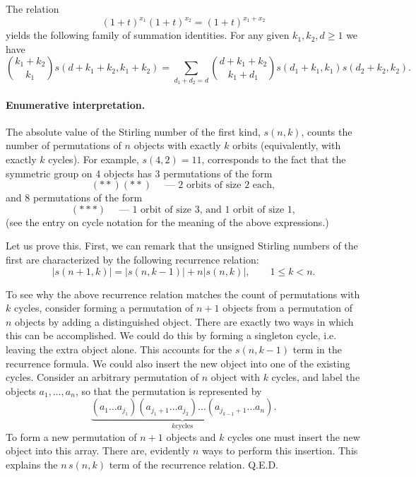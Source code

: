 \documentclass[12pt]{article}
\begin{document}
The relation
$$(1+t)^{x_1} (1+t)^{x_2} = (1+t)^{x_1+x_2}$$
yields the following family of summation identities. For any given
$k_1,k_2,d\geq 1$ we have 
$$
\binom{k_1+k_2}{k_1} s(d+k_1+k_2,k_1+k_2) =
\sum_{d_1+d_2=d} \binom{d+k_1+k_2}{k_1+d_1} s(d_1+k_1,k_1)
s(d_2+k_2,k_2).$$

\paragraph{Enumerative interpretation.}
The absolute value of the Stirling number of the first kind, $s(n,k)$,
counts the number of permutations of $n$ objects with exactly $k$
orbits (equivalently, with exactly $k$ cycles).  For example, $s(4,2)=11$, corresponds to the fact that
the symmetric group on 4 objects has $3$ permutations of the form
$$(* *)(* *)\quad \mbox{ --- 2 orbits of size 2 each},$$
and $8$ permutations
of the form 
$$(* * *)\quad \mbox{ --- 1 orbit of size 3, and 1 orbit of size
  1},$$
(see the entry on cycle notation for the meaning of the above
expressions.)

Let us prove this.  First, we can remark that the unsigned Stirling
numbers of the first are characterized by the following recurrence
relation:
$$|s(n+1,k)| = |s(n,k-1)| + n|s(n,k)|,\qquad 1\leq k < n.$$ 

To see why the above recurrence relation matches the count of
permutations with $k$ cycles, consider forming a permutation of $n+1$
objects from a permutation of $n$ objects by adding a distinguished
object.  There are exactly two ways in which this can be accomplished.
We could do this by forming a singleton cycle, i.e. leaving the extra
object alone.  This accounts for the $s(n,k-1)$ term in the recurrence
formula.  We could also insert the new object into one of the existing
cycles.  Consider an arbitrary permutation of $n$ object with $k$
cycles, and label the objects $a_1,\ldots,a_n$, so that the
permutation is represented by
$$\underbrace{(a_1 \ldots a_{j_1})(a_{j_1+1} \ldots
  a_{j_2})\ldots(a_{j_{k-1}+1} \ldots a_n)}_{\displaystyle k \mbox{
    cycles}}.$$
To form a new permutation of $n+1$ objects and $k$ cycles one must
insert the new object into this array.  There are, evidently $n$ ways
to perform this insertion.  This explains the $n\,s(n,k)$ term of the
recurrence relation.  Q.E.D.
\end{document}
